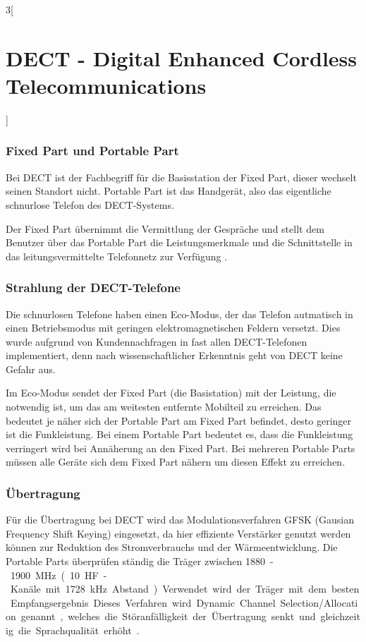 \begin{multicols}{3}[\section{DECT - Digital Enhanced Cordless Telecommunications}]
\subsubsection*{Fixed Part und Portable Part}
Bei DECT ist der Fachbegriff für die  Basisstation der Fixed Part, dieser wechselt seinen Standort nicht. Portable Part ist das Handgerät, also das eigentliche schnurlose Telefon des DECT-Systems. 

Der Fixed Part übernimmt die Vermittlung der Gespräche und stellt dem Benutzer über das Portable Part die Leistungsmerkmale und die Schnittstelle in das leitungsvermittelte Telefonnetz zur Verfügung \cite{dect.1}.


\subsubsection*{Strahlung der DECT-Telefone}
Die schnurlosen Telefone haben einen Eco-Modus, der das Telefon autmatisch in einen Betriebsmodus mit geringen elektromagnetischen Feldern versetzt. Dies wurde aufgrund von Kundennachfragen in fast allen DECT-Telefonen implementiert, denn nach wissenschaftlicher Erkenntnis geht von DECT keine Gefahr aus.

Im Eco-Modus sendet der Fixed Part (die Basistation) mit der Leistung, die notwendig ist, um das am weitesten entfernte Mobilteil zu erreichen. Das bedeutet je näher sich der Portable Part am Fixed Part befindet, desto geringer ist die Funkleistung. Bei einem Portable Part bedeutet es, dass die Funkleistung verringert wird bei Annäherung an den Fixed Part. Bei mehreren Portable Parts müssen alle Geräte sich dem Fixed Part nähern um diesen Effekt zu erreichen. \cite{dect.1}

\subsubsection*{Übertragung}
Für die Übertragung bei DECT wird das Modulationsverfahren GFSK (Gausian Frequency Shift Keying) eingesetzt, da hier effiziente Verstärker genutzt werden können zur Reduktion des Stromverbrauchs und der Wärmeentwicklung.
Die Portable Parts überprüfen ständig die Träger zwischen \SI{1880}-\SI{1900}{\mega\hertz} (10 HF-Kanäle mit \SI{1728}{\kilo\hertz} Abstand). Verwendet wird der Träger mit dem besten Empfangsergebnis. Dieses Verfahren wird Dynamic Channel Selection/Allocation genannt, welches die Störanfälligkeit der Übertragung senkt und gleichzeitig die Sprachqualität erhöht \cite{dect.1}.


\end{multicols}
